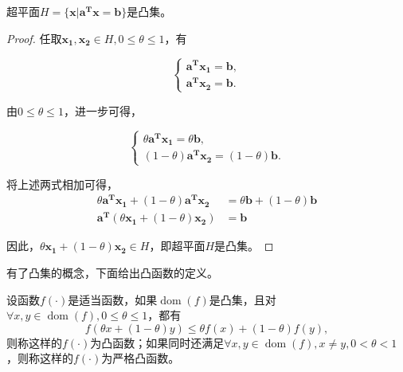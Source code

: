 \begin{problem}
    超平面$H=\{\bm{x}|\bm{a^{T}}\bm{x}=\bm{b}\}$是凸集。
\end{problem}
\begin{proof}
    任取$\bm{x_{1}}, \bm{x_{2}}\in H, 0 \leq \theta \leq 1$，有
    
    \begin{equation*}
        \begin{cases}
            \bm{a^{T}x_{1}} = \bm{b}, \\
            \bm{a^{T}x_{2}} = \bm{b}.
        \end{cases}
    \end{equation*}

    由$0\leq \theta \leq 1$，进一步可得，
    
    \begin{equation*}
        \begin{cases}
            \theta \bm{a^{T}x_{1}} = \theta \bm{b}, \\
            (1-\theta) \bm{a^{T}x_{2}} = (1-\theta) \bm{b}.
        \end{cases}
    \end{equation*}

    将上述两式相加可得，
    \begin{equation*}
        \begin{split}
            \theta \bm{a^{T}x_{1}} + (1-\theta) \bm{a^{T}x_{2}} &= \theta \bm{b} + (1-\theta) \bm{b} \\
            \bm{a^{T}} (\theta \bm{x_{1}}+(1-\theta)\bm{x_{2}}) &= \bm{b}
        \end{split}
    \end{equation*}

    因此，$\theta \bm{x_{1}}+(1-\theta)\bm{x_{2}} \in H$，即超平面$H$是凸集。
\end{proof}

有了凸集的概念，下面给出凸函数的定义。

\begin{definition}
    设函数$f(\cdot)$是适当函数，如果$\mathop{\mathrm{dom}} (f)$是凸集，且对$\forall x, y\in \mathop{\mathrm{dom}} (f), 0\leq \theta \leq 1$，都有
    \begin{equation}
        f(\theta x+(1-\theta)y) \leq \theta f(x) + (1-\theta)f(y),
    \end{equation}
    则称这样的$f(\cdot)$为凸函数；如果同时还满足$\forall x, y\in \mathop{\mathrm{dom}} (f), x \neq y, 0<\theta<1$，则称这样的$f(\cdot)$为严格凸函数。
\end{definition}

